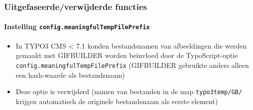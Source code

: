 
\begin{frame}[fragile]
	\frametitle{Uitgefaseerde/verwijderde functies}
	\framesubtitle{Instelling \texttt{config.meaningfulTempFilePrefix}}

	\begin{itemize}

		\item In TYPO3 CMS < 7.1 konden bestandsnamen van afbeeldingen die werden gemaakt 
			met GIFBUILDER worden beïnvloed door de TypoScript-optie 
			\texttt{config.meaningfulTempFilePrefix}\newline
			\small
				(GIFBUILDER gebruikte anders alleen een hash-waarde als bestandsnaam)
			\normalsize

		\item Deze optie is verwijderd (namen van bestanden in de map \texttt{typo3temp/GB/}
			krijgen automatisch de originele bestandsnaam als eerste element)

	\end{itemize}

\end{frame}




